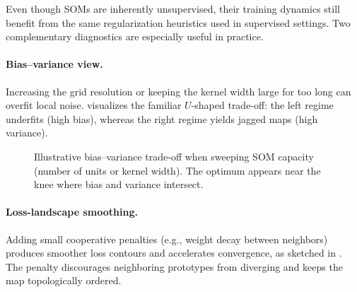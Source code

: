 Even though SOMs are inherently unsupervised, their training dynamics still benefit from the same regularization heuristics used in supervised settings. Two complementary diagnostics are especially useful in practice.

\paragraph{Bias--variance view.} Increasing the grid resolution or keeping the kernel width large for too long can overfit local noise.  visualizes the familiar \(U\)-shaped trade-off: the left regime underfits (high bias), whereas the right regime yields jagged maps (high variance).

\begin{figure}[t]
    \centering
    \caption{Illustrative bias--variance trade-off when sweeping SOM capacity (number of units or kernel width). The optimum appears near the knee where bias and variance intersect.}
    \label{fig:lec5-bias-variance}
\end{figure}


\paragraph{Loss-landscape smoothing.} Adding small cooperative penalties (e.g., weight decay between neighbors) produces smoother loss contours and accelerates convergence, as sketched in . The penalty discourages neighboring prototypes from diverging and keeps the map topologically ordered.

